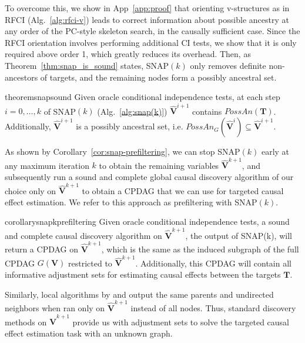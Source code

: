 To overcome this, we show in App~\ref{app:proof} that orienting v-structures as in RFCI \citep{colombo2012learning} (Alg.~\ref{alg:rfci-v}) leads to correct information about possible ancestry at any order of the PC-style skeleton search, in the causally sufficient case.
Since the RFCI orientation involves performing additional CI tests, we show that it is only required above order 1, which greatly reduces its overhead.
Then, as Theorem~\ref{thm:snap_is_sound} states, SNAP$(k)$ only removes definite non-ancestors of targets, and the remaining nodes form a possibly ancestral set.

\begin{restatable}[]{theorem}{snapsound}
\label{thm:snap_is_sound}
Given oracle conditional independence tests, at each step $i=0, \dots, k$ of \ac{SNAP}$(k)$ (Alg.~\ref{alg:snap(k)}) $\hat{\mathbf{V}}^{i+1}$ contains $PossAn(\mathbf{T})$. Additionally, $\hat{\mathbf{V}}^{i+1}$ is a possibly ancestral set, i.e. $PossAn_G(\hat{\mathbf{V}}^i) \subseteq \hat{\mathbf{V}}^{i+1}$.
\end{restatable}

As shown by Corollary~\ref{cor:snap-prefiltering}, we can stop SNAP$(k)$ early at any maximum iteration $k$ to obtain the remaining variables $\hat{\mathbf{V}}^{k+1}$, and subsequently run a sound and complete global causal discovery algorithm of our choice only on $\hat{\mathbf{V}}^{k+1}$ to obtain a CPDAG that we can use for targeted causal effect estimation.
We refer to this approach as prefiltering with SNAP$(k)$.

\begin{restatable}[]{corollary}{snapkprefiltering}
\label{cor:snap-prefiltering}
Given oracle conditional independence tests, a sound and complete causal discovery algorithm on $\hat{\mathbf{V}}^{k+1}$, the output of \ac{SNAP}(k), will return a CPDAG on $\hat{\mathbf{V}}^{k+1}$, which is the same as the induced subgraph of the full CPDAG $G(\mathbf{V})$ restricted to $\hat{\mathbf{V}}^{k+1}$. Additionally, this CPDAG will contain all informative adjustment sets for estimating causal effects between the targets $\mathbf{T}$.
\end{restatable}

Similarly, local algorithms by \citep{wang2014discovering} and \citep{gupta2023local} output the same parents and undirected neighbors when ran only on $\hat{\mathbf{V}}^{k+1}$ instead of all nodes.
Thus, standard discovery methods on $\hat{\mathbf{V}}^{k+1}$ provide us with adjustment sets to solve the targeted causal effect estimation task with an unknown graph.

